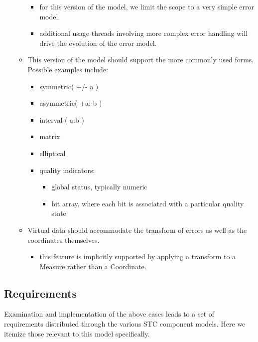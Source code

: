 \documentclass[11pt,a4paper]{ivoa}
\begin{document}
\begin{itemize}
\begin{itemize}
      \begin{itemize}
         \item for this version of the model, we limit the scope to a very simple error model.
         \item additional usage threads involving more complex error handling will drive the evolution of the error model.
      \end{itemize}
      \item This version of the model should support the more commonly used forms.  Possible examples include:
      \begin{itemize}
        \item symmetric( +/- a )
        \item asymmetric( +a:-b )
        \item interval ( a:b )
        \item matrix
        \item elliptical
        \item quality indicators:
         \begin{itemize}
            \item global status, typically numeric
            \item bit array, where each bit is associated with a particular quality state 
         \end{itemize}
      \end{itemize}
      \item Virtual data should accommodate the transform of errors as well as the coordinates themselves.
        \begin{itemize}
           \item this feature is implicitly supported by applying a transform to a Measure rather than a Coordinate.
        \end{itemize}
    \end{itemize}
  \end{itemize}

\subsection{Requirements}
\label{sect:reqs}

 Examination and implementation of the above cases leads to a set of requirements distributed through the various STC component models.  Here we 
itemize those relevant to this model specifically.
\end{document}
